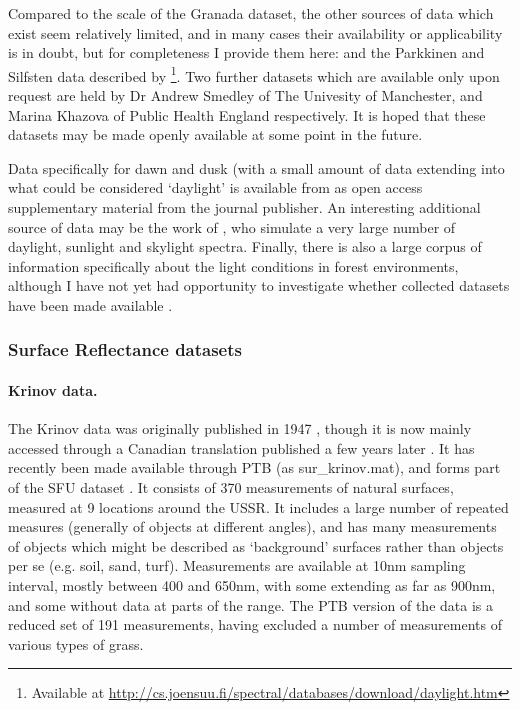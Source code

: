 Compared to the scale of the Granada dataset, the other sources of data which exist seem relatively limited, and in many cases their availability or applicability is in doubt, but for completeness I provide them here: \citet{condit_spectral_1964, tarrant_spectral_1968,dicarlo_illuminant_2000} and the Parkkinen and Silfsten data described by \citet{kohonen_databases_2006}\footnote{Available at \url{http://cs.joensuu.fi/spectral/databases/download/daylight.htm}}. Two further datasets which are available only upon request are held by Dr Andrew Smedley of The Univesity of Manchester, and Marina Khazova of Public Health England respectively. It is hoped that these datasets may be made openly available at some point in the future.

Data specifically for dawn and dusk (with a small amount of data extending into what could be considered `daylight' is available from \citet{spitschan_variation_2016} as open access supplementary material from the journal publisher. An interesting additional source of data may be the work of \citet{peyvandi_colorimetric_2016}, who simulate a very large number of daylight, sunlight and skylight spectra. Finally, there is also a large corpus of information specifically about the light conditions in forest environments, although I have not yet had opportunity to investigate whether collected datasets have been made available \citep{sumner_catarrhine_2000,chiao_characterization_2000,federer_spectral_1966,geiger_climate_2003,thery_forest_2001,xu_changes_2013,wang_real-time_2006,endler_color_1993,brinkmann_light_1971,de_castro_light_2000,freyman_spectral_1968,fassnacht_review_2016,blackburn_seasonal_1995}.


\subsubsection{Surface Reflectance datasets}

\paragraph{Krinov data.}
The Krinov data was originally published in 1947 \citep{krinov_spektralnaya_1947}, though it is now mainly accessed through a Canadian translation published a few years later \cite{krinov_spectral_1953}. It has recently been made available through \gls{PTB} \cite{brainard_psychophysics_1997} (as sur\_krinov.mat), and forms part of the SFU dataset \cite{barnard_data_2002}. It consists of 370 measurements of natural surfaces, measured at 9 locations around the USSR. It includes a large number of repeated measures (generally of objects at different angles), and has many measurements of objects which might be described as `background' surfaces rather than objects per se (e.g. soil, sand, turf). Measurements are available at 10nm sampling interval, mostly between 400 and 650nm, with some extending as far as 900nm, and some without data at parts of the range. The \gls{PTB} version of the data is a reduced set of 191 measurements, having excluded a number of measurements of various types of grass. 

